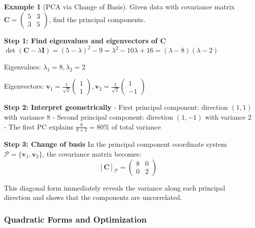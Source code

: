 \documentclass[12pt]{article}
\numberwithin{equation}{section}
\newcommand{\vect}[1]{\boldsymbol{#1}}   %
\newcommand{\mat}[1]{\mathbf{#1}}        %
\theoremstyle{plain}
\theoremstyle{definition}
\newtheorem{example}[theorem]{Example}
\theoremstyle{remark}
\begin{document}
\begin{example}[PCA via Change of Basis]
Given data with covariance matrix $\mat{C} = \begin{pmatrix} 5 & 3 \\ 3 & 5 \end{pmatrix}$, find the principal components.

\textbf{Step 1: Find eigenvalues and eigenvectors of $\mat{C}$}
$\det(\mat{C} - \lambda\mat{I}) = (5-\lambda)^2 - 9 = \lambda^2 - 10\lambda + 16 = (\lambda-8)(\lambda-2)$

Eigenvalues: $\lambda_1 = 8, \lambda_2 = 2$

Eigenvectors: $\vect{v}_1 = \frac{1}{\sqrt{2}}\begin{pmatrix} 1 \\ 1 \end{pmatrix}, \vect{v}_2 = \frac{1}{\sqrt{2}}\begin{pmatrix} 1 \\ -1 \end{pmatrix}$

\textbf{Step 2: Interpret geometrically}
- First principal component: direction $(1,1)$ with variance 8
- Second principal component: direction $(1,-1)$ with variance 2
- The first PC explains $\frac{8}{8+2} = 80\%$ of total variance

\textbf{Step 3: Change of basis}
In the principal component coordinate system $\mathcal{P} = \{\vect{v}_1, \vect{v}_2\}$, the covariance matrix becomes:
$$[\mat{C}]_{\mathcal{P}} = \begin{pmatrix} 8 & 0 \\ 0 & 2 \end{pmatrix}$$

This diagonal form immediately reveals the variance along each principal direction and shows that the components are uncorrelated.
\end{example}

\subsubsection{Quadratic Forms and Optimization}
\end{document}
